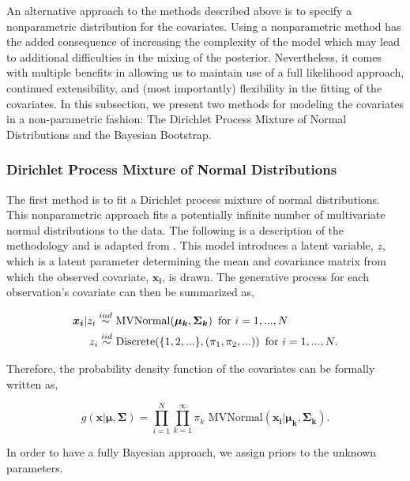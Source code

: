 \documentclass[
  12pt,
]{article}
\begin{document}
An alternative approach to the methods described above is to specify a
nonparametric distribution for the covariates. Using a nonparametric
method has the added consequence of increasing the complexity of the
model which may lead to additional difficulties in the mixing of the
posterior. Nevertheless, it comes with multiple benefits in allowing us
to maintain use of a full likelihood approach, continued extensibility,
and (most importantly) flexibility in the fitting of the covariates. In
this subsection, we present two methods for modeling the covariates in a
non-parametric fashion: The Dirichlet Process Mixture of Normal
Distributions and the Bayesian Bootstrap.

\subsubsection{Dirichlet Process Mixture of Normal Distributions}

The first method is to fit a Dirichlet process mixture of normal
distributions. This nonparametric approach fits a potentially infinite
number of multivariate normal distributions to the data. The following
is a description of the methodology and is adapted from
\cite{gelman_bayesian_2014}. This model introduces a latent variable,
\(z\), which is a latent parameter determining the mean and covariance
matrix from which the observed covariate, \(\boldsymbol{x_i}\), is
drawn. The generative process for each observation's covariate can then
be summarized as,

\begin{align}
\boldsymbol{x_i}|z_i \stackrel{ind}{\sim} & \text{ MVNormal}(\boldsymbol{\mu_k},\boldsymbol{\Sigma_k}) \hspace{5px} \text{for } i=1,...,N\\
z_i \stackrel{iid}{\sim} & \text{ Discrete}(\{1,2,...\},(\pi_1,\pi_2,...)) \hspace{5px} \text{for } i=1,...,N.
\end{align}

Therefore, the probability density function of the covariates can be
formally written as,

\begin{equation}
g(\boldsymbol{x}|\boldsymbol{\mu},\boldsymbol{\Sigma}) = \prod_{i=1}^N \prod_{k=1}^\infty \pi_k \text{ MVNormal}(\boldsymbol{x_i}|\boldsymbol{\mu_k},\boldsymbol{\Sigma_k}).
\end{equation}

In order to have a fully Bayesian approach, we assign priors to the
unknown parameters.
\end{document}
